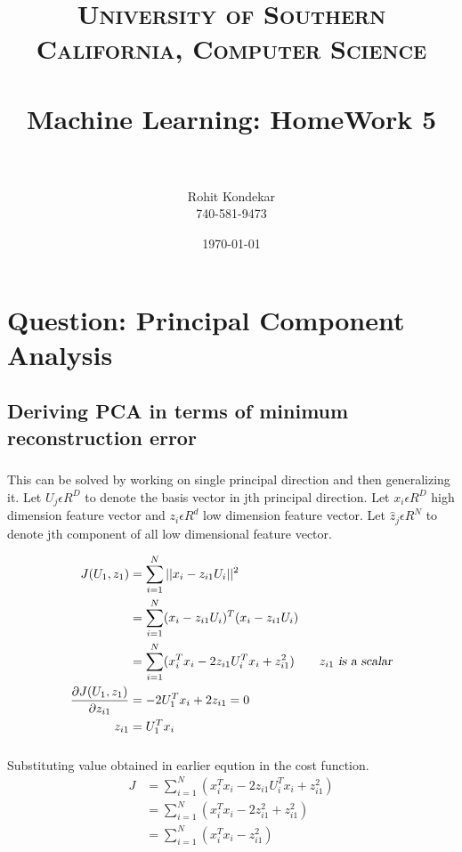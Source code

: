 \documentclass[paper=a4, fontsize=11pt]{scrartcl} %
\title{	
\normalfont \normalsize 
\textsc{University of Southern California, Computer Science} \\ [25pt] %
\horrule{0.5pt} \\[0.4cm] %
\huge Machine Learning: HomeWork 5 \\ %
\horrule{2pt} \\[0.5cm] %
}
\author{Rohit Kondekar\\
740-581-9473} %
\date{\normalsize\today} %
\numberwithin{equation}{section} %
\numberwithin{figure}{section} %
\numberwithin{table}{section} %
\begin{document}
\maketitle %


\section{Question: Principal Component Analysis }
\subsection{Deriving PCA in terms of minimum reconstruction error}
\subsubsection{}
This can be solved by working on single principal direction and then generalizing it. Let $U_{j}\epsilon R^{D}$ to denote the basis vector in jth principal direction. Let  $x_{i}\epsilon R^{D}$ high dimension feature vector and $z_{i}\epsilon R^{d}$ low dimension feature vector. Let $\hat{z}_{j}\epsilon R^{N}$ to denote jth component of all low dimensional feature vector.

\begin{align*} 
J(U_{1},z_{1}) &=  \sum_{i=1}^{N}||x_{i}-z_{i1}U_{i}||^{2}\\
&= \sum_{i=1}^{N} (x_{i}-z_{i1}U_{i})^{T}(x_{i}-z_{i1}U_{i})\\
&= \sum_{i=1}^{N} (x_{i}^{T}x_{i} - 2z_{i1}U_{i}^{T}x_{i} + z_{i1}^{2}) ~~~~~~\textsl{$z_{i1}$ is a scalar}\\
\dfrac{\partial J(U_{1},z_{1})}{\partial z_{i1}} &= -2U_{1}^{T}x_{i} + 2z_{i1} = 0\\
z_{i1} &= U_{1}^{T}x_{i}
\end{align*}

\subsubsection{}
Substituting value obtained in earlier eqution in the cost function.
\begin{align*} 
J &= \sum_{i=1}^{N} ( x_{i}^{T}x_{i} - 2z_{i1}U_{i}^{T}x_{i} + z_{i1}^{2} )\\
&= \sum_{i=1}^{N} ( x_{i}^{T}x_{i} - 2z_{i1}^{2} + z_{i1}^{2} )\\
&= \sum_{i=1}^{N} ( x_{i}^{T}x_{i} - z_{i1}^{2} )\\
\end{align*}
\end{document}
